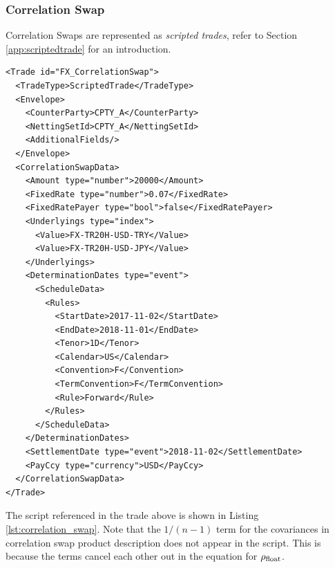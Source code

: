 \subsubsection{Correlation Swap}


Correlation Swaps are represented as {\em scripted trades}, refer to Section
\ref{app:scriptedtrade} for an introduction.

\begin{verbatim}
<Trade id="FX_CorrelationSwap">
  <TradeType>ScriptedTrade</TradeType>
  <Envelope>
    <CounterParty>CPTY_A</CounterParty>
    <NettingSetId>CPTY_A</NettingSetId>
    <AdditionalFields/>
  </Envelope>
  <CorrelationSwapData>
    <Amount type="number">20000</Amount>
    <FixedRate type="number">0.07</FixedRate>
    <FixedRatePayer type="bool">false</FixedRatePayer>
    <Underlyings type="index">
      <Value>FX-TR20H-USD-TRY</Value>
      <Value>FX-TR20H-USD-JPY</Value>
    </Underlyings>
    <DeterminationDates type="event">
      <ScheduleData>
        <Rules>
          <StartDate>2017-11-02</StartDate>
          <EndDate>2018-11-01</EndDate>
          <Tenor>1D</Tenor>
          <Calendar>US</Calendar>
          <Convention>F</Convention>
          <TermConvention>F</TermConvention>
          <Rule>Forward</Rule>
        </Rules>
      </ScheduleData>
    </DeterminationDates>
    <SettlementDate type="event">2018-11-02</SettlementDate>
    <PayCcy type="currency">USD</PayCcy>
  </CorrelationSwapData>
</Trade>
\end{verbatim}

The script referenced in the trade above is shown in Listing \ref{lst:correlation_swap}. Note that the $1/(n-1)$ term for the covariances in correlation swap product description does not appear in the script. This is because the terms cancel each other out in the equation for $\rho_{\rm float}$.

